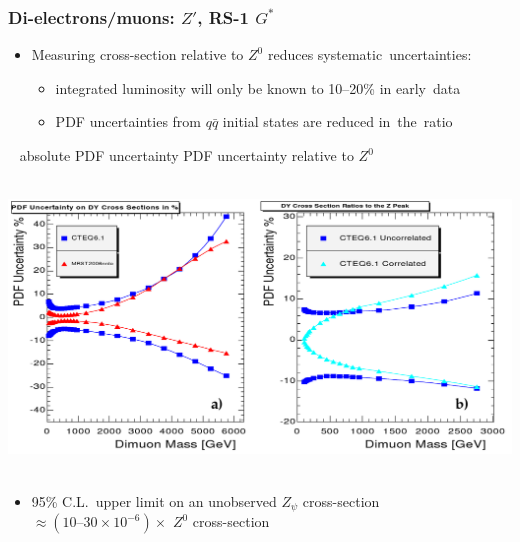 \documentclass[compress]{beamer}
\begin{document}
\begin{frame}
\frametitle{Di-electrons/muons: $Z'$, RS-1 $G^*$}

\begin{itemize}
\item Measuring cross-section relative to $Z^0$ reduces \mbox{systematic uncertainties:\hspace{-1 cm}}
\begin{itemize}
\item integrated luminosity will only be known to 10--20\% in \mbox{early data\hspace{-1 cm}}
\item PDF uncertainties from $q\bar{q}$ initial states are reduced \mbox{in the ratio\hspace{-1 cm}}
\end{itemize}
\end{itemize}

\vfill
\mbox{ } \hfill \hfill \hfill absolute PDF uncertainty \hspace{1 cm} PDF uncertainty relative to $Z^0$ \hfill \mbox{ }

\mbox{ } \hfill \includegraphics[width=0.9\linewidth]{Zprime_mumu_pdfuncert.png} \hfill \mbox{ }

\begin{itemize}
\item 95\% C.L.\ upper limit on an unobserved $Z_\psi$ cross-section \\ \hfill $\approx \left( \mbox{10--30} \times 10^{-6} \right) \times$ $Z^0$ cross-section
\end{itemize}




\label{diobject_reach}
\end{frame}
\end{document}
